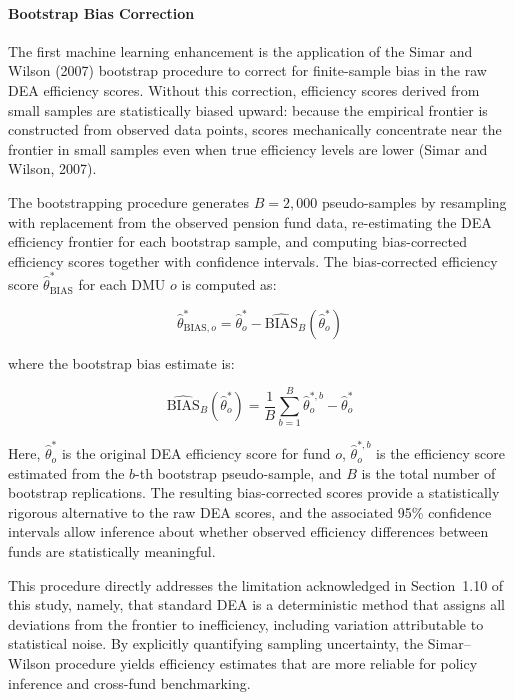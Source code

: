 \documentclass[12pt,a4paper]{article}
\begin{document}
\paragraph{Bootstrap Bias Correction}

The first machine learning enhancement is the application of the Simar and Wilson (2007) bootstrap procedure to correct for finite-sample bias in the raw DEA efficiency scores. Without this correction, efficiency scores derived from small samples are statistically biased upward: because the empirical frontier is constructed from observed data points, scores mechanically concentrate near the frontier in small samples even when true efficiency levels are lower (Simar and Wilson, 2007).

The bootstrapping procedure generates $B = 2{,}000$ pseudo-samples by resampling with replacement from the observed pension fund data, re-estimating the DEA efficiency frontier for each bootstrap sample, and computing bias-corrected efficiency scores together with confidence intervals. The bias-corrected efficiency score $\hat{\theta}^*_{\text{BIAS}}$ for each DMU $o$ is computed as:

\begin{equation}
    \hat{\theta}^*_{\text{BIAS},o} = \hat{\theta}^*_o - \widehat{\text{BIAS}}_B\!\left(\hat{\theta}^*_o\right)
\end{equation}

where the bootstrap bias estimate is:

\begin{equation}
    \widehat{\text{BIAS}}_B\!\left(\hat{\theta}^*_o\right) = \frac{1}{B} \sum_{b=1}^{B} \hat{\theta}^{*,b}_o - \hat{\theta}^*_o
\end{equation}

Here, $\hat{\theta}^*_o$ is the original DEA efficiency score for fund $o$, $\hat{\theta}^{*,b}_o$ is the efficiency score estimated from the $b$-th bootstrap pseudo-sample, and $B$ is the total number of bootstrap replications. The resulting bias-corrected scores provide a statistically rigorous alternative to the raw DEA scores, and the associated 95\% confidence intervals allow inference about whether observed efficiency differences between funds are statistically meaningful.

This procedure directly addresses the limitation acknowledged in Section~1.10 of this study, namely, that standard DEA is a deterministic method that assigns all deviations from the frontier to inefficiency, including variation attributable to statistical noise. By explicitly quantifying sampling uncertainty, the Simar--Wilson procedure yields efficiency estimates that are more reliable for policy inference and cross-fund benchmarking.
\end{document}
